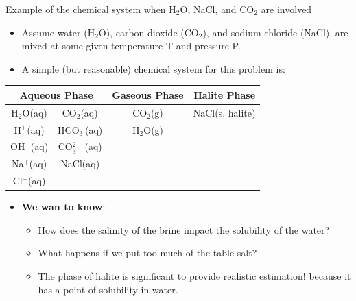 \begin{frame}{Example of the chemical system when H$_{2}$O, NaCl, and CO$_{2}$
are involved}
\begin{itemize}
\item Assume water (H$_{2}$O), carbon dioxide (CO$_{2}$), and sodium chloride
(NaCl), are mixed at some given temperature T and pressure P.
\pause 
\item A simple (but reasonable) chemical system for this problem is:
\end{itemize}
\begin{center}
\begin{tabular}{cccc}
\toprule 
\multicolumn{2}{c}{\textbf{Aqueous Phase}} & \multicolumn{1}{c}{\textbf{Gaseous Phase}} & \textbf{Halite Phase}\tabularnewline
\midrule
H$_{2}$O(aq) & CO$_{2}$(aq) & CO$_{2}$(g) & NaCl(s, halite)\tabularnewline
H$^{+}$(aq) & HCO$_{3}^{-}$(aq) & H$_{2}$O(g) & \tabularnewline
OH$^{-}$(aq) & CO$_{3}^{2-}$(aq) &  & \tabularnewline
Na$^{+}$(aq) &  NaCl(aq) &  & \tabularnewline
Cl$^{-}$(aq) &  &  & \tabularnewline
\bottomrule
\end{tabular}
\par\end{center}
\pause
\begin{itemize}
\item \alert{\textbf{We wan to know}}: 
\begin{itemize}
\item How does the salinity of the brine impact the solubility of the water? 
\item What happens if we put too much of the table salt? 
\item The phase of halite is significant to provide realistic estimation!
 because it has a point of solubility in water. 
\end{itemize}
\end{itemize}


\end{frame}
%
%
